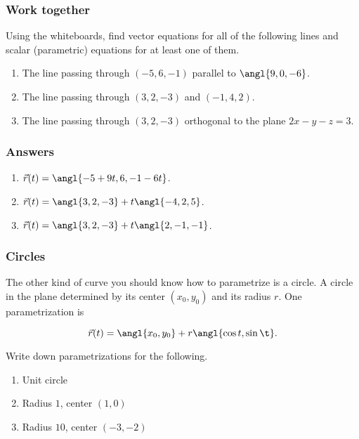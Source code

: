 \documentclass[11pt,ignorenonframetext,aspectratio=169,xcolor={svgnames}]{beamer}
\begin{document}
\begin{frame}\frametitle{Work together}

Using the whiteboards, find vector equations for all of the following
lines and scalar (parametric) equations for at least one of them.

\begin{enumerate}
\def\labelenumi{\arabic{enumi}.}

\item
  The line passing through $(-5, 6, -1)$ parallel to $\angl{9, 0, -6}$.
\item
  The line passing through $(3, 2, -3)$ and $(-1, 4, 2)$.
\item
  The line passing through $(3, 2, -3)$ orthogonal to the plane
  $2x-y-z=3$.
\end{enumerate}

\end{frame}

\begin{frame}\frametitle{Answers}

\begin{enumerate}
\def\labelenumi{\arabic{enumi}.}

\item
  $\vec{r}(t) = \angl{-5 + 9t, 6, -1 - 6t}$.
\item
  $\vec{r}(t) = \angl{3, 2, -3} + t\angl{-4, 2, 5}$.
\item
  $\vec{r}(t) = \angl{3, 2, -3} + t\angl{2, -1, -1}$.
\end{enumerate}

\end{frame}

\begin{frame}\frametitle{Circles}

The other kind of curve you should know how to parametrize is a circle.
A circle in the plane determined by its center $(x_0, y_0)$ and its
radius $r$. One parametrization is

\[\vec{r}(t) = \angl{x_0, y_0} + r \angl{\cos t, \sin \t}.\]

Write down parametrizations for the following.

\begin{enumerate}
\def\labelenumi{\arabic{enumi}.}

\item
  Unit circle
\item
  Radius $1$, center $(1,0)$
\item
  Radius $10$, center $(-3, -2)$
\end{enumerate}

\end{frame}
\end{document}
